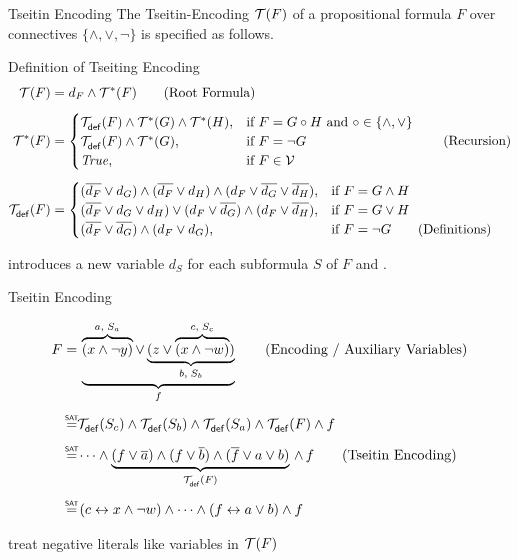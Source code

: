\documentclass[t]{sdqbeamer}
\begin{document}
\begin{frame}{Tseitin Encoding}
The Tseitin-Encoding $\tseitin{F}$ of a propositional formula $F$ over connectives $\{ \land, \lor, \lnot \}$ is specified as follows.
\begin{block}{Definition of Tseiting Encoding}
	\vspace*{-3ex}
	\begin{align*}
	\tseitin{F} &= d_F \wedge \tseitinRec{F}{*} \tag{Root Formula}\\[1ex]
	\tseitinRec{F}{*} &= \begin{cases}
			\tseitinDef{F}{} \wedge \tseitinRec{G}{*} \wedge \tseitinRec{H}{*},
				& \text{if } F = G \circ H \text{ and } \circ \in \{\wedge, \vee\}\\
			\tseitinDef{F}{} \wedge \tseitinRec{G}{*}, & \text{if } F = \neg G\\
			\true, & \text{if } F \in \allvars
		\end{cases} \tag{Recursion}\\[1ex]
	\tseitinDef{F}{} &= \begin{cases}
			(\overline{d_F} \vee d_G) \wedge (\overline{d_F} \vee d_H) \land
				(d_F \lor \overline{d_G} \lor \overline{d_H}), & \text{if } F = G \wedge H\\
			(\overline{d_F} \vee d_G \vee d_H) \lor (d_F \vee \overline{d_G}) \wedge 
				(d_F \vee \overline{d_H}) , & \text{if } F = G \vee H\\
			(\overline{d_F} \lor \overline{d_G}) \land (d_F \lor d_G), & \text{if } F = \neg G \tag{Definitions}\\
			\end{cases}
	\end{align*}
\end{block}
 introduces a new variable $d_S$ for each subformula $S$ of $F$ and .
\end{frame}

\begin{frame}{Tseitin Encoding}
	\begin{example}
		\vspace*{-3ex}
		\begin{align*}
			F =&\, \underbrace{\overbrace{(x \land \lnot y)}^{a,\;S_a} \lor
			\underbrace{(z \lor \overbrace{(x \land \lnot w)}^{c,\;S_c})}_{b,\;S_b}}_f \tag{Encoding / Auxiliary Variables}\\[1ex]
			\sateq & \tseitinDef{S_c}{} \land \tseitinDef{S_b}{} \land \tseitinDef{S_a}{} \land \tseitinDef{F}{} \land f\\[1ex]
			\sateq & \dots \land \underbrace{(f \lor \overline{a}) \land (f \lor \overline{b}) \land (\overline{f} \lor a \lor b)}_{\tseitinDef{F}{}} \,\land\, f \tag{Tseitin Encoding} \\[1ex]
			\sateq &\, (c \leftrightarrow x \land \lnot w) \land \dots \land (f \leftrightarrow a \lor b) \land f
		\end{align*}
	\end{example}
	 treat negative literals like variables in $\tseitin{F}$
\end{frame}
\end{document}
